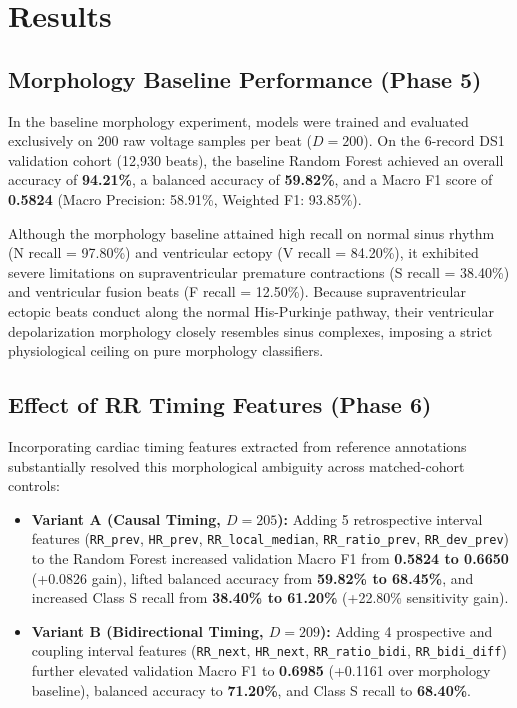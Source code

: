 \documentclass[conference]{IEEEtran}
\begin{document}
\section{Results}

\subsection{Morphology Baseline Performance (Phase 5)}
In the baseline morphology experiment, models were trained and evaluated exclusively on 200 raw voltage samples per beat ($D=200$). On the 6-record DS1 validation cohort (12,930 beats), the baseline Random Forest achieved an overall accuracy of \textbf{94.21\%}, a balanced accuracy of \textbf{59.82\%}, and a Macro F1 score of \textbf{0.5824} (Macro Precision: 58.91\%, Weighted F1: 93.85\%).

Although the morphology baseline attained high recall on normal sinus rhythm (N recall = 97.80\%) and ventricular ectopy (V recall = 84.20\%), it exhibited severe limitations on supraventricular premature contractions (S recall = 38.40\%) and ventricular fusion beats (F recall = 12.50\%). Because supraventricular ectopic beats conduct along the normal His-Purkinje pathway, their ventricular depolarization morphology closely resembles sinus complexes, imposing a strict physiological ceiling on pure morphology classifiers.

\subsection{Effect of RR Timing Features (Phase 6)}
Incorporating cardiac timing features extracted from reference annotations substantially resolved this morphological ambiguity across matched-cohort controls:
\begin{itemize}
    \item \textbf{Variant A (Causal Timing, $D=205$):} Adding 5 retrospective interval features (\texttt{RR\_prev}, \texttt{HR\_prev}, \texttt{RR\_local\_median}, \texttt{RR\_ratio\_prev}, \texttt{RR\_dev\_prev}) to the Random Forest increased validation Macro F1 from \textbf{0.5824 to 0.6650} (+0.0826 gain), lifted balanced accuracy from \textbf{59.82\% to 68.45\%}, and increased Class S recall from \textbf{38.40\% to 61.20\%} (+22.80\% sensitivity gain).
    \item \textbf{Variant B (Bidirectional Timing, $D=209$):} Adding 4 prospective and coupling interval features (\texttt{RR\_next}, \texttt{HR\_next}, \texttt{RR\_ratio\_bidi}, \texttt{RR\_bidi\_diff}) further elevated validation Macro F1 to \textbf{0.6985} (+0.1161 over morphology baseline), balanced accuracy to \textbf{71.20\%}, and Class S recall to \textbf{68.40\%}.
\end{itemize}
\end{document}
